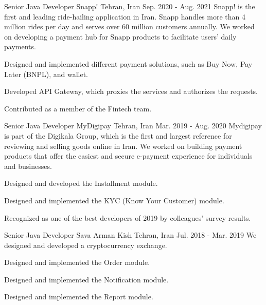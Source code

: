 \begin{cventries}
  \cventry
    {Senior Java Developer} %
    {Snapp!} %
    {Tehran, Iran} %
    {Sep. 2020 - Aug. 2021} %
    {
      Snapp! is the first and leading ride-hailing application in Iran. Snapp handles more than 4 million rides per day and serves over 60 million customers annually. We worked on developing a payment hub for Snapp products to facilitate users' daily payments.
    }
    {
      \begin{cvitems} %
        \item {Designed and implemented different payment solutions, such as Buy Now, Pay Later (BNPL), and wallet.}
        \item {Developed API Gateway, which proxies the services and authorizes the requests.}
        \item {Contributed as a member of the Fintech team.}
      \end{cvitems}
    }

  \cventry
    {Senior Java Developer} %
    {MyDigipay} %
    {Tehran, Iran} %
    {Mar. 2019 - Aug. 2020} %
    {
      Mydigipay is part of the Digikala Group, which is the first and largest reference for reviewing and selling goods online in Iran. We worked on building payment products that offer the easiest and secure e-payment experience for individuals and businesses.
    }
    {
      \begin{cvitems} %
        \item {Designed and developed the Installment module.}
        \item {Designed and implemented the KYC (Know Your Customer) module.}
        \item {Recognized as one of the best developers of 2019 by colleagues' survey results.}
      \end{cvitems}
    }

  \cventry
    {Senior Java Developer} %
    {Sava Arman Kish} %
    {Tehran, Iran} %
    {Jul. 2018 - Mar. 2019} %
    {
      We designed and developed a cryptocurrency exchange.
    }
    {
      \begin{cvitems} %
        \item {Designed and implemented the Order module.}
        \item {Designed and implemented the Notification module.}
        \item {Designed and implemented the Report module.}
      \end{cvitems}
    }


\end{cventries}
